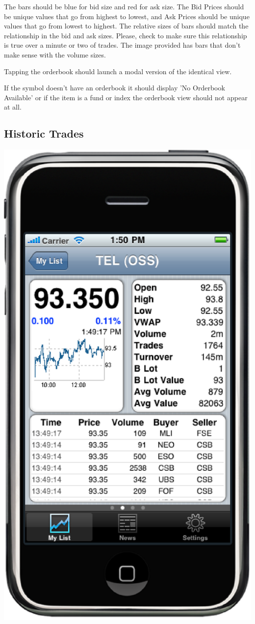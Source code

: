 \documentclass[12pt,twoside,letterpaper]{report}
\begin{document}
The bars should be blue for bid size and red for ask size. The Bid Prices should be unique values that go from highest to lowest, and Ask Prices should be unique values that go from lowest to highest. The relative sizes of bars should match the relationship in the bid and ask sizes. Please, check to make sure this relationship is true over a minute or two of trades. The image provided has bars that don't make sense with the volume sizes.

Tapping the orderbook should launch a modal version of the identical view.

If the symbol doesn't have an orderbook it should display 'No Orderbook Available' or if the item is a fund or index the orderbook view should not appear at all.

\subsection*{Historic Trades}
\includegraphics[scale=0.5]{symbolDetailHistoricTrades}
\end{document}
